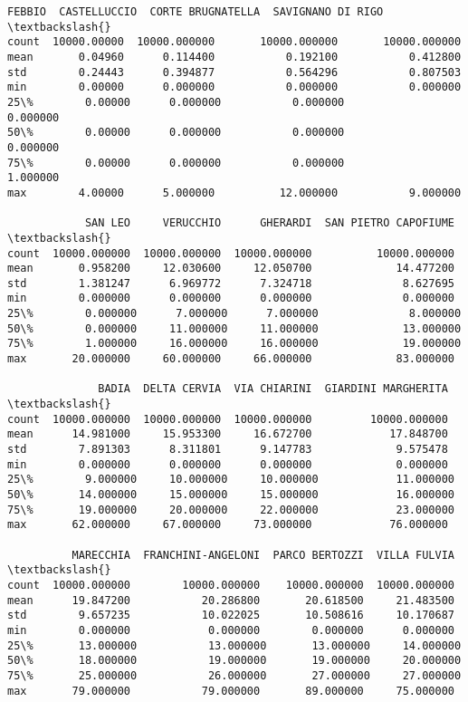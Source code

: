\documentclass[11pt]{article}
\makeatletter
\newcommand{\boxspacing}{\kern\kvtcb@left@rule\kern\kvtcb@boxsep}
\newcommand{\prompt}[4]{
        {\ttfamily\llap{{\color{#2}[#3]:\hspace{3pt}#4}}\vspace{-\baselineskip}}
    }
\makeatother
\begin{document}
            \begin{tcolorbox}[breakable, size=fbox, boxrule=.5pt, pad at break*=1mm, opacityfill=0]
\prompt{Out}{outcolor}{22}{\boxspacing}
\begin{Verbatim}[commandchars=\\\{\}]
            FEBBIO  CASTELLUCCIO  CORTE BRUGNATELLA  SAVIGNANO DI RIGO  \textbackslash{}
count  10000.00000  10000.000000       10000.000000       10000.000000
mean       0.04960      0.114400           0.192100           0.412800
std        0.24443      0.394877           0.564296           0.807503
min        0.00000      0.000000           0.000000           0.000000
25\%        0.00000      0.000000           0.000000           0.000000
50\%        0.00000      0.000000           0.000000           0.000000
75\%        0.00000      0.000000           0.000000           1.000000
max        4.00000      5.000000          12.000000           9.000000

            SAN LEO     VERUCCHIO      GHERARDI  SAN PIETRO CAPOFIUME  \textbackslash{}
count  10000.000000  10000.000000  10000.000000          10000.000000
mean       0.958200     12.030600     12.050700             14.477200
std        1.381247      6.969772      7.324718              8.627695
min        0.000000      0.000000      0.000000              0.000000
25\%        0.000000      7.000000      7.000000              8.000000
50\%        0.000000     11.000000     11.000000             13.000000
75\%        1.000000     16.000000     16.000000             19.000000
max       20.000000     60.000000     66.000000             83.000000

              BADIA  DELTA CERVIA  VIA CHIARINI  GIARDINI MARGHERITA  \textbackslash{}
count  10000.000000  10000.000000  10000.000000         10000.000000
mean      14.981000     15.953300     16.672700            17.848700
std        7.891303      8.311801      9.147783             9.575478
min        0.000000      0.000000      0.000000             0.000000
25\%        9.000000     10.000000     10.000000            11.000000
50\%       14.000000     15.000000     15.000000            16.000000
75\%       19.000000     20.000000     22.000000            23.000000
max       62.000000     67.000000     73.000000            76.000000

          MARECCHIA  FRANCHINI-ANGELONI  PARCO BERTOZZI  VILLA FULVIA  \textbackslash{}
count  10000.000000        10000.000000    10000.000000  10000.000000
mean      19.847200           20.286800       20.618500     21.483500
std        9.657235           10.022025       10.508616     10.170687
min        0.000000            0.000000        0.000000      0.000000
25\%       13.000000           13.000000       13.000000     14.000000
50\%       18.000000           19.000000       19.000000     20.000000
75\%       25.000000           26.000000       27.000000     27.000000
max       79.000000           79.000000       89.000000     75.000000


\end{Verbatim}
\end{tcolorbox}
\end{document}
